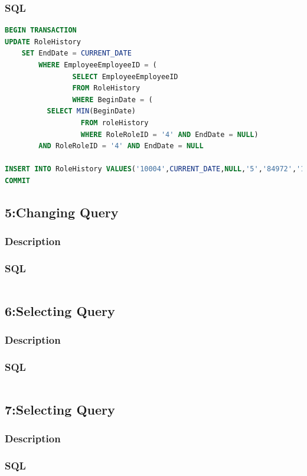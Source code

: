 \documentclass[a4paper, 10pt]{article}
\begin{document}
\subsubsection{SQL}
\begin{lstlisting}[language=SQL]
BEGIN TRANSACTION
UPDATE RoleHistory
	SET EndDate = CURRENT_DATE
		WHERE EmployeeEmployeeID = (
				SELECT EmployeeEmployeeID 
				FROM RoleHistory
				WHERE BeginDate = (
          SELECT MIN(BeginDate)
				  FROM roleHistory
				  WHERE RoleRoleID = '4' AND EndDate = NULL)
        AND RoleRoleID = '4' AND EndDate = NULL

INSERT INTO RoleHistory VALUES('10004',CURRENT_DATE,NULL,'5','84972','16516');
COMMIT
\end{lstlisting}

\subsection{5:Changing Query}
\subsubsection{Description}

\subsubsection{SQL}
\begin{lstlisting}[language=SQL]
\end{lstlisting}

\subsection{6:Selecting Query}
\subsubsection{Description}
\subsubsection{SQL}
\begin{lstlisting}[language=SQL]
\end{lstlisting}

\subsection{7:Selecting Query}
\subsubsection{Description}
\subsubsection{SQL}
\begin{lstlisting}[language=SQL]
\end{lstlisting}
\end{document}
